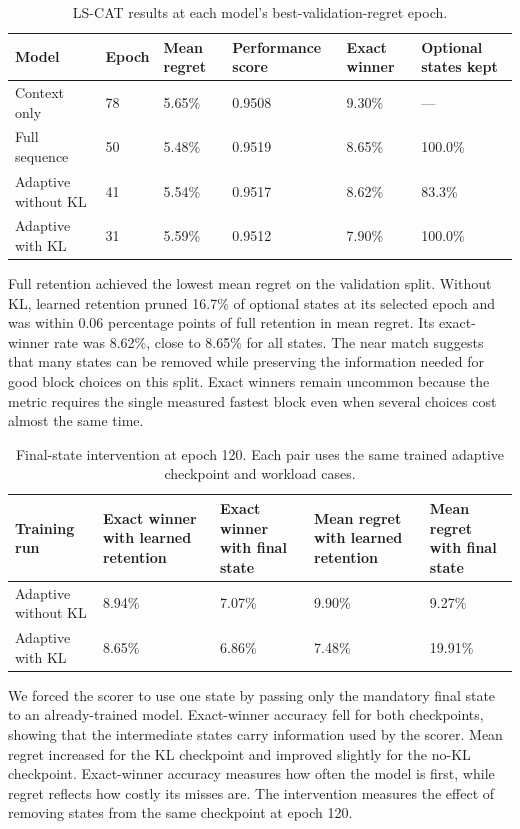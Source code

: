 \documentclass[11pt,letterpaper]{article}
\begin{document}
\begin{table}[H]
\centering\small
\caption{LS-CAT results at each model's best-validation-regret epoch.}
\begin{tabularx}{\linewidth}{@{}L{.24\linewidth}YYYYY@{}}
\toprule
\textbf{Model} & \textbf{Epoch} & \textbf{Mean regret} & \textbf{Performance score} & \textbf{Exact winner} & \textbf{Optional states kept} \\
\midrule
Context only & 78 & 5.65\% & 0.9508 & 9.30\% & --- \\
Full sequence & 50 & 5.48\% & 0.9519 & 8.65\% & 100.0\% \\
Adaptive without KL & 41 & 5.54\% & 0.9517 & 8.62\% & 83.3\% \\
Adaptive with KL & 31 & 5.59\% & 0.9512 & 7.90\% & 100.0\% \\
\bottomrule
\end{tabularx}
\end{table}

Full retention achieved the lowest mean regret on the validation split. Without KL, learned retention pruned
16.7\% of optional states at its selected epoch and was within 0.06 percentage points of full retention in
mean regret. Its exact-winner rate was 8.62\%, close to 8.65\% for all states. The near match suggests that
many states can be removed while preserving the information needed for good block choices on this split.
Exact winners remain uncommon because the metric requires the single measured fastest block even when
several choices cost almost the same time.

\begin{table}[H]
\centering\small
\caption{Final-state intervention at epoch 120. Each pair uses the same trained adaptive checkpoint and workload cases.}
\begin{tabularx}{\linewidth}{@{}L{.22\linewidth}YYYY@{}}
\toprule
\textbf{Training run} & \textbf{Exact winner with learned retention} & \textbf{Exact winner with final state} & \textbf{Mean regret with learned retention} & \textbf{Mean regret with final state} \\
\midrule
Adaptive without KL & 8.94\% & 7.07\% & 9.90\% & 9.27\% \\
Adaptive with KL & 8.65\% & 6.86\% & 7.48\% & 19.91\% \\
\bottomrule
\end{tabularx}
\end{table}

We forced the scorer to use one state by passing only the mandatory final state to an already-trained model.
Exact-winner accuracy fell for both checkpoints, showing that the intermediate states carry information used
by the scorer. Mean regret increased for the KL checkpoint and improved slightly for the no-KL checkpoint.
Exact-winner accuracy measures how often the model is first, while regret reflects how costly its misses
are. The intervention measures the effect of removing states from the same checkpoint at epoch 120.
\end{document}
